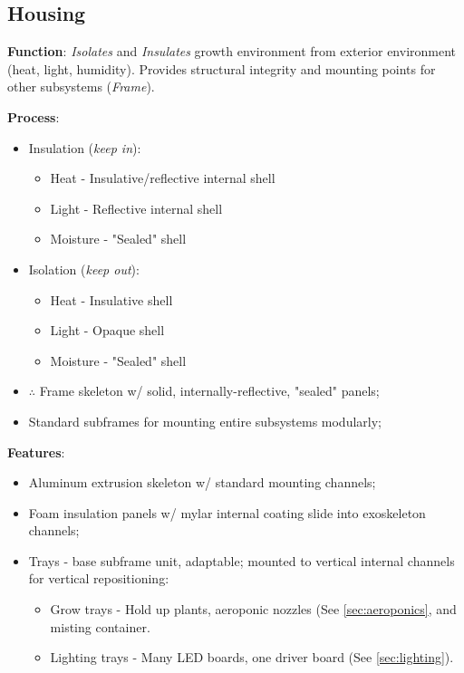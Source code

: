 \documentclass{report}
\begin{document}
\newpage

\subsection{Housing}
\label{sec:housing}

\textbf{Function}: \textit{Isolates} and \textit{Insulates} growth environment from exterior environment (heat, light, humidity). Provides structural integrity and mounting points for other subsystems (\textit{Frame}).

\textbf{Process}:
\begin{itemize}
    \item Insulation (\textit{keep in}):
    \begin{itemize}
        \item Heat - Insulative/reflective internal shell
        \item Light - Reflective internal shell
        \item Moisture - "Sealed" shell
    \end{itemize}
    \item Isolation (\textit{keep out}):
    \begin{itemize}
        \item Heat - Insulative shell
        \item Light - Opaque shell
        \item Moisture - "Sealed" shell
    \end{itemize}
    \item $\therefore$ Frame skeleton w/ solid, internally-reflective, "sealed" panels;
    \item Standard subframes for mounting entire subsystems modularly;
\end{itemize}

\textbf{Features}:
\begin{itemize}
    \item Aluminum extrusion skeleton w/ standard mounting channels;
    \item Foam insulation panels w/ mylar internal coating slide into exoskeleton channels;
    \item Trays - base subframe unit, adaptable; mounted to vertical internal channels for vertical repositioning:
    \begin{itemize}
        \item Grow trays - Hold up plants, aeroponic nozzles (See \ref{sec:aeroponics}, and misting container.
        \item Lighting trays - Many LED boards, one driver board (See \ref{sec:lighting}).
    \end{itemize}
\end{itemize}
\end{document}
